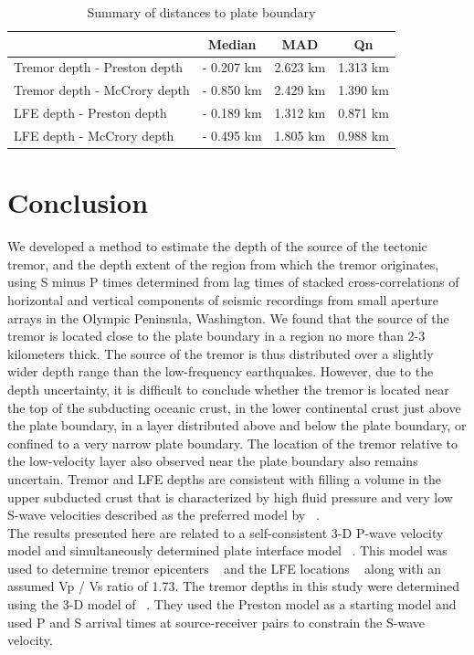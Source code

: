 \documentclass[draft]{agujournal2019}
\begin{document}
\begin{table}
\caption{Summary of distances to plate boundary}
\centering
\begin{tabular}{l c c c}
\hline
 & Median & MAD & Qn \\ 
\hline
Tremor depth - Preston depth & - 0.207 km & 2.623 km & 1.313 km \\
Tremor depth - McCrory depth & - 0.850 km & 2.429 km & 1.390 km \\
LFE depth - Preston depth & - 0.189 km & 1.312 km & 0.871 km \\
LFE depth - McCrory depth & - 0.495 km & 1.805 km & 0.988 km \\
\hline
\end{tabular}
\end{table}

\section{Conclusion}

We developed a method to estimate the depth of the source of the tectonic tremor, and the depth extent of the region from which the tremor originates, using S minus P times determined from lag times of stacked cross-correlations of horizontal and vertical components of seismic recordings from small aperture arrays in the Olympic Peninsula, Washington. We found that the source of the tremor is located close to the plate boundary in a region no more than 2-3 kilometers thick. The source of the tremor is thus distributed over a slightly wider depth range than the low-frequency earthquakes. However, due to the depth uncertainty, it is difficult to conclude whether the tremor is located near the top  of the subducting oceanic crust, in the lower continental crust just above the plate boundary, in a layer distributed above and below the plate boundary, or confined to a very narrow plate boundary. The location of the tremor relative to the low-velocity layer also observed near the plate boundary also remains uncertain.  Tremor and LFE depths are consistent with filling a volume in the upper subducted crust that is characterized by high fluid pressure and very low S-wave velocities described as the preferred model by ~. \\

The results presented here are related to a self-consistent 3-D P-wave velocity model and simultaneously determined plate interface model ~\cite{PRE_2003}. This model was used to determine tremor epicenters ~\cite{GHO_2012} and the LFE locations ~\cite{SWE_2019, CHE_2017_JGR} along with an assumed Vp / Vs ratio of 1.73.  The tremor depths in this study were determined using the 3-D model of ~. They used the Preston model as a starting model and used P and S arrival times at source-receiver pairs to constrain the S-wave velocity.  
\end{document}
